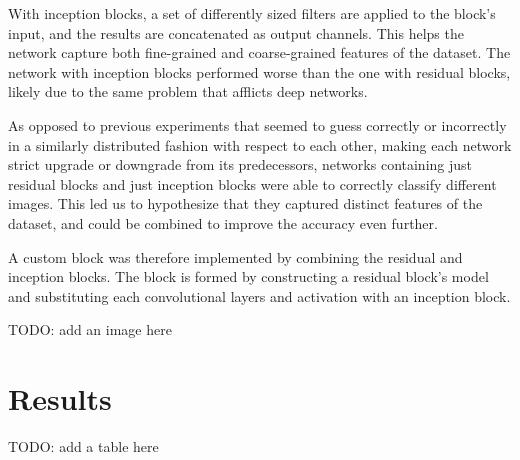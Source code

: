 \documentclass[11pt]{article}
\begin{document}
\begin{multicols}{2}
      With inception blocks, a set of differently sized filters are applied to the block's 
      input, and the results are concatenated as output channels. This helps the network 
      capture both fine-grained and coarse-grained features of the dataset. The network
      with inception blocks performed worse than the one with residual blocks, likely
      due to the same problem that afflicts deep networks.

      As opposed to previous experiments that seemed to guess correctly or
      incorrectly in a similarly distributed fashion with respect to each
      other, making each network strict upgrade or downgrade from its predecessors, 
      networks containing just residual blocks and just inception blocks were able to correctly
      classify different images. This led us to hypothesize that they captured distinct 
      features of the dataset, and could be combined to improve the accuracy even further.

      A custom block was therefore implemented by combining the residual and
      inception blocks. The block is formed by constructing a residual block's model and
      substituting each convolutional layers and activation with an inception block.

      TODO: add an image here

      \label{sec:results}
      \section{Results}

      TODO: add a table here
      \label{tab:results}
      \begin{table}
      \end{table}


\end{multicols}
\end{document}
